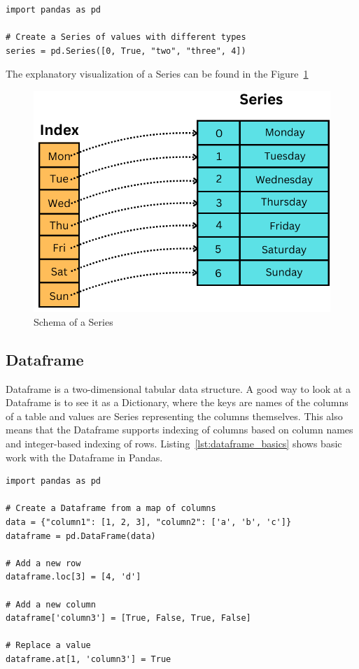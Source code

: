 \begin{lstlisting}[caption=Heterogenous Series, label={lst:series_heterogeneous}, captionpos=b]
import pandas as pd

# Create a Series of values with different types
series = pd.Series([0, True, "two", "three", 4])
\end{lstlisting}

The explanatory visualization of a Series can be found in the Figure~\ref{fig:series_schema}

\begin{figure}[H]
    \caption{Schema of a Series}
    \label{fig:series_schema}
    \centering
    \includegraphics[scale=0.4]{img/Series}
\end{figure}

\subsection{Dataframe}

Dataframe is a two-dimensional tabular data structure.
A good way to look at a Dataframe is to see it as a Dictionary, where the keys are names of the columns of a table
and values are Series representing the columns themselves.
This also means that the Dataframe supports indexing of columns based on column names and integer-based indexing of rows.
Listing~\ref{lst:dataframe_basics} shows basic work with the Dataframe in Pandas.

\begin{lstlisting}[caption=Working with Dataframe in Pandas, label={lst:dataframe_basics}, captionpos=b]
import pandas as pd

# Create a Dataframe from a map of columns
data = {"column1": [1, 2, 3], "column2": ['a', 'b', 'c']}
dataframe = pd.DataFrame(data)

# Add a new row
dataframe.loc[3] = [4, 'd']

# Add a new column
dataframe['column3'] = [True, False, True, False]

# Replace a value
dataframe.at[1, 'column3'] = True
\end{lstlisting}

